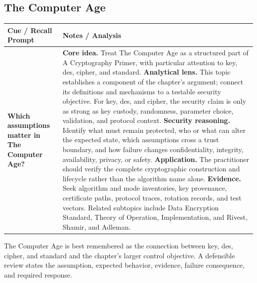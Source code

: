 \documentclass[11pt]{article}
\newcommand{\CornellHeader}{%
\rowcolor{Navy}\color{white}\bfseries Cue / Recall Prompt & \color{white}\bfseries Notes / Analysis\\\hline}
\newcommand{\CornellRow}[2]{%
\cellcolor{CueGray}\RaggedRight\textbf{#1} & \RaggedRight #2\\\hline}
\begin{document}
\subsection*{The Computer Age}
\begin{longtable}{>{\RaggedRight\arraybackslash}p{}|>{\RaggedRight\arraybackslash}p{}}
\CornellHeader
\CornellRow{Which assumptions matter in The Computer Age?}{\textbf{Core idea.} Treat The Computer Age as a structured part of A Cryptography Primer, with particular attention to key, des, cipher, and standard. \textbf{Analytical lens.} This topic establishes a component of the chapter's argument; connect its definitions and mechanisms to a testable security objective. For key, des, and cipher, the security claim is only as strong as key custody, randomness, parameter choice, validation, and protocol context. \textbf{Security reasoning.} Identify what must remain protected, who or what can alter the expected state, which assumptions cross a trust boundary, and how failure changes confidentiality, integrity, availability, privacy, or safety. \textbf{Application.} The practitioner should verify the complete cryptographic construction and lifecycle rather than the algorithm name alone. \textbf{Evidence.} Seek algorithm and mode inventories, key provenance, certificate paths, protocol traces, rotation records, and test vectors. Related subtopics include Data Encryption Standard, Theory of Operation, Implementation, and Rivest, Shamir, and Adleman.}
\end{longtable}
\begin{topicsummary}
The Computer Age is best remembered as the connection between key, des, cipher, and standard and the chapter's larger control objective. A defensible review states the assumption, expected behavior, evidence, failure consequence, and required response.
\end{topicsummary}
\end{document}

